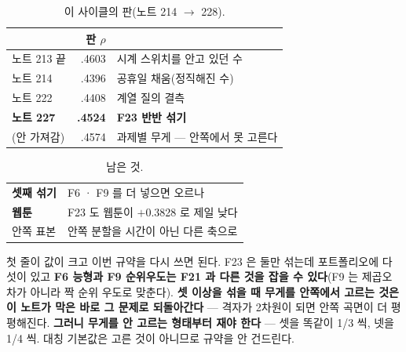 \documentclass[10pt]{article}
\begin{document}

\begin{table}[t]
\centering\tsize
\caption{이 사이클의 판(노트 214 $\to$ 228).}
\begin{tabular}{lrl}
\toprule
& 판 $\rho$ & \\
\midrule
노트 213 끝 & .4603 & 시계 스위치를 안고 있던 수 \\
노트 214 & .4396 & 공휴일 채움(정직해진 수) \\
노트 222 & .4408 & 계열 질의 결측 \\
\textbf{노트 227} & \textbf{.4524} & \textbf{F23 반반 섞기} \\
\midrule
(안 가져감) & .4574 & 과제별 무게 --- 안쪽에서 못 고른다 \\
\bottomrule
\end{tabular}
\end{table}

\begin{table}[t]
\centering\tsize
\caption{남은 것.}
\begin{tabular}{ll}
\toprule
\textbf{셋째 섞기} & F6 · F9 를 더 넣으면 오르나 \\
\textbf{웹툰} & F23 도 웹툰이 $+$0.3828 로 제일 낮다 \\
안쪽 표본 & 안쪽 분할을 시간이 아닌 다른 축으로 \\
\bottomrule
\end{tabular}
\end{table}

첫 줄이 값이 크고 이번 규약을 다시 쓰면 된다. F23 은 둘만 섞는데
포트폴리오에 다섯이 있고 \textbf{F6 능형과 F9 순위우도는 F21 과 다른
것을 잡을 수 있다}(F9 는 제곱오차가 아니라 짝 순위 우도로 맞춘다).
\textbf{셋 이상을 섞을 때 무게를 안쪽에서 고르는 것은 이 노트가 막은
바로 그 문제로 되돌아간다} --- 격자가 2차원이 되면 안쪽 곡면이 더
평평해진다. \textbf{그러니 무게를 안 고르는 형태부터 재야 한다} ---
셋을 똑같이 1/3 씩, 넷을 1/4 씩. 대칭 기본값은 고른 것이 아니므로
규약을 안 건드린다.
\end{document}
